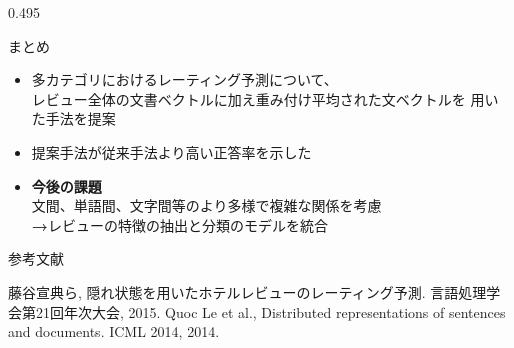 \documentclass[unicode,10pt]{beamer}
\newcommand{\columnsize}{0.495\textwidth}
\newcommand{\arrow}{\textcolor{ttiblue}{\textbf{→}}\hspace{1ex}}
\newcommand{\itemtitle}[1]{\textbf{#1}\\}
\begin{document}
\begin{frame}
\begin{columns}[onlytextwidth,t]
\begin{column}{\columnsize}
  \begin{block}{まとめ}
    \begin{itemize}
      \item 多カテゴリにおけるレーティング予測について、\\
            レビュー全体の文書ベクトルに加え重み付け平均された文ベクトルを
            用いた手法を提案
      \item 提案手法が従来手法\cite{fujitani15}より高い正答率を示した
      \item \itemtitle{今後の課題}
            文間、単語間、文字間等のより多様で複雑な関係を考慮 \\
            \arrow レビューの特徴の抽出と分類のモデルを統合 \\
    \end{itemize}
  \end{block}

  参考文献
  
  \begin{thebibliography}{9}
    藤谷宣典ら,
    隠れ状態を用いたホテルレビューのレーティング予測.
    言語処理学会第21回年次大会, 2015.
    Quoc Le et al.,
    Distributed representations of sentences and documents.
    ICML 2014, 2014.
  \end{thebibliography}
\end{column}

\end{columns}
\end{frame}
\end{document}
